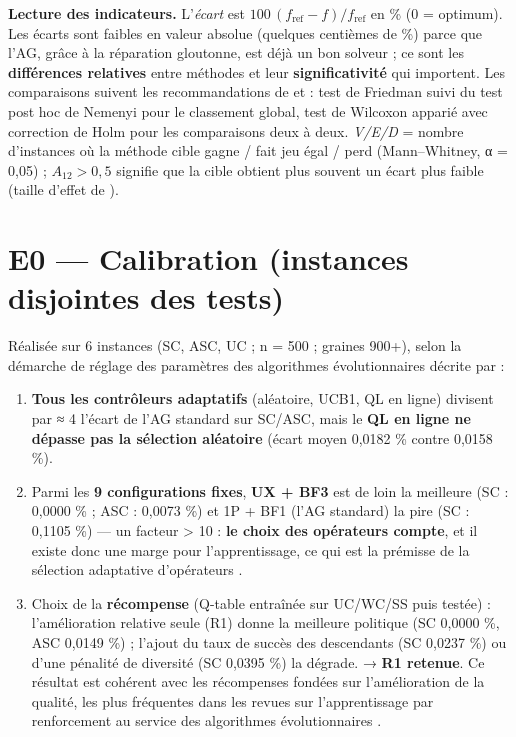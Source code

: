 \documentclass[
  french,
  11pt,
  a4paper,
]{article}
\providecommand{\tightlist}{%
  \setlength{\itemsep}{0pt}\setlength{\parskip}{0pt}}
\begin{document}
\textbf{Lecture des indicateurs.} L'\emph{écart} est
\(100\,(f_{\text{ref}} - f)/f_{\text{ref}}\) en \% (0 = optimum). Les
écarts sont faibles en valeur absolue (quelques centièmes de \%) parce
que l'AG, grâce à la réparation gloutonne, est déjà un bon solveur ; ce
sont les \textbf{différences relatives} entre méthodes et leur
\textbf{significativité} qui importent. Les comparaisons suivent les
recommandations de \textcite{demsar_2006} et \textcite{derrac_2011} :
test de Friedman suivi du test post hoc de Nemenyi pour le classement
global, test de Wilcoxon apparié avec correction de Holm pour les
comparaisons deux à deux. \emph{V/E/D} = nombre d'instances où la
méthode cible gagne / fait jeu égal / perd (Mann--Whitney, α = 0,05) ;
\(A_{12} > 0{,}5\) signifie que la cible obtient plus souvent un écart
plus faible (taille d'effet de \textcite{vargha_delaney_2000}).

\section{E0 --- Calibration (instances disjointes des
tests)}\label{analyse_resultats-e0-calibration-instances-disjointes-des-tests}

Réalisée sur 6 instances (SC, ASC, UC ; n = 500 ; graines 900+), selon
la démarche de réglage des paramètres des algorithmes évolutionnaires
décrite par \textcite{eiben_1999} :

\begin{enumerate}
\def\labelenumi{\arabic{enumi}.}
\tightlist
\item
  \textbf{Tous les contrôleurs adaptatifs} (aléatoire, UCB1, QL en
  ligne) divisent par ≈ 4 l'écart de l'AG standard sur SC/ASC, mais le
  \textbf{QL en ligne ne dépasse pas la sélection aléatoire} (écart
  moyen 0,0182 \% contre 0,0158 \%).
\item
  Parmi les \textbf{9 configurations fixes}, \textbf{UX + BF3} est de
  loin la meilleure (SC : 0,0000 \% ; ASC : 0,0073 \%) et 1P + BF1 (l'AG
  standard) la pire (SC : 0,1105 \%) --- un facteur \textgreater{} 10 :
  \textbf{le choix des opérateurs compte}, et il existe donc une marge
  pour l'apprentissage, ce qui est la prémisse de la sélection
  adaptative d'opérateurs
  \autocite{dacosta_2008,karimi-mamaghan_machine_2022}.
\item
  Choix de la \textbf{récompense} (Q-table entraînée sur UC/WC/SS puis
  testée) : l'amélioration relative seule (R1) donne la meilleure
  politique (SC 0,0000 \%, ASC 0,0149 \%) ; l'ajout du taux de succès
  des descendants (SC 0,0237 \%) ou d'une pénalité de diversité (SC
  0,0395 \%) la dégrade. → \textbf{R1 retenue}. Ce résultat est cohérent
  avec les récompenses fondées sur l'amélioration de la qualité, les
  plus fréquentes dans les revues sur l'apprentissage par renforcement
  au service des algorithmes évolutionnaires
  \autocite{song_reinforcement_2023,li_bridging_2025}.
\end{enumerate}
\end{document}
